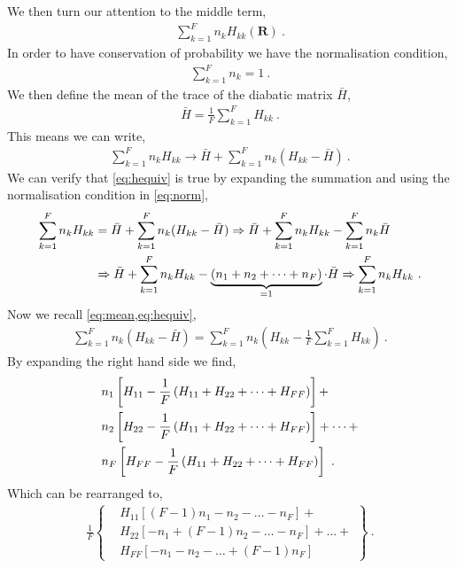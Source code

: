 We then turn our attention to the middle term,
\begin{align}
\sum\limits_{k=1}^{F} n_{k} H_{kk}(\bm{R})~.
\end{align}
In order to have conservation of probability we have the normalisation condition,
\begin{align}\label{eq:norm}
\sum\limits_{k=1}^{F} n_{k} = 1~.
\end{align}
We then define the mean of the trace of the diabatic matrix $ \bar{H} $,
\begin{align}\label{eq:mean}
\bar{H} = \frac{1}{F}\sum\limits_{k=1}^{F} H_{kk}~.
\end{align}
This means we can write,
\begin{align}\label{eq:hequiv}
\sum\limits_{k=1}^{F} n_{k} H_{kk} \rightarrow \bar{H} + \sum\limits_{k=1}^{F} n_{k} (H_{kk} - \bar{H})~.
\end{align}
We can verify that \cref{eq:hequiv} is true by expanding the summation and using the normalisation condition in \cref{eq:norm},
\begin{align}
\sum\limits_{k=1}^{F} n_{k} H_{kk} & = \bar{H} + \sum\limits_{k=1}^{F} n_{k} (H_{kk} - \bar{H}) \Rightarrow \bar{H} + \sum\limits_{k=1}^{F} n_{k} H_{kk} - \sum\limits_{k=1}^{F} n_{k} \bar{H}\nonumber\\
& \Rightarrow \bar{H} + \sum\limits_{k=1}^{F} n_{k} H_{kk} - \underbrace{(n_{1} + n_{2} +\dots + n_{F})}_{=1} \cdot \bar{H} \Rightarrow \sum\limits_{k=1}^{F} n_{k} H_{kk}~.
\end{align}
Now we recall \cref{eq:mean,eq:hequiv},
\begin{align}
\sum\limits_{k=1}^{F} n_{k} (H_{kk} - \bar{H}) = \sum\limits_{k=1}^{F} n_{k} (H_{kk} - \frac{1}{F} \sum\limits_{k=1}^{F}H_{kk})~.
\end{align}
By expanding the right hand side we find,
\begin{subequations}
\begin{align}
& n_{1}\left[H_{11} - \frac{1}{F} \left(H_{11} + H_{22} + \dots + H_{FF} \right) \right] + \nonumber\\ 
& n_{2}\left[H_{22} - \frac{1}{F} \left(H_{11} + H_{22} + \dots + H_{FF} \right) \right] + \dots + \\
& n_{F}\left[H_{FF} - \frac{1}{F} \left(H_{11} + H_{22} + \dots + H_{FF} \right) \right]~. \nonumber
\end{align}
\end{subequations}
Which can be rearranged to,
\begin{align}\label{eq:rear}
\frac{1}{F} \left\{\begin{aligned}
& H_{11} \left[ (F-1) n_{1} - n_{2} - \dots - n_{F} \right] + \\
& H_{22} \left[ - n_{1} + (F-1) n_{2} - \dots - n_{F} \right] + \dots + \\
& H_{FF} \left[ - n_{1} - n_{2} -\dots + (F-1) n_{F} \right]
\end{aligned}\right\}~.
\end{align}
